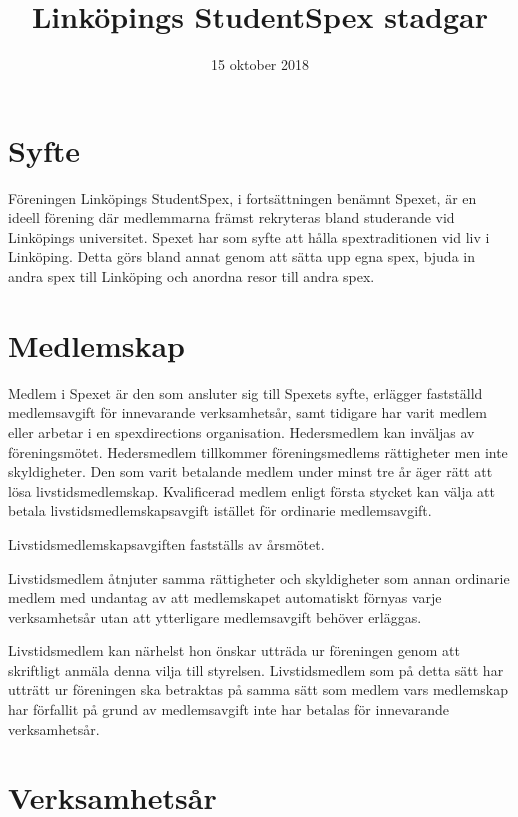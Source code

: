 \documentclass[a4paper]{article}
\title{Linköpings StudentSpex stadgar}
\author{}
\date{15 oktober 2018}
\begin{document}
\maketitle

\section{Syfte}
Föreningen Linköpings StudentSpex, i fortsättningen benämnt Spexet, är en ideell förening där medlemmarna främst rekryteras bland studerande vid Linköpings universitet. Spexet har som syfte att hålla spextraditionen vid liv i Linköping. Detta görs bland annat genom att sätta upp egna spex, bjuda in andra spex till Linköping och anordna resor till andra spex.

\section{Medlemskap}
Medlem i Spexet är den som ansluter sig till Spexets syfte, erlägger fastställd medlemsavgift för innevarande verksamhetsår, samt tidigare har varit medlem eller arbetar i en spexdirections organisation.\newline
\newline
Hedersmedlem kan inväljas av föreningsmötet. Hedersmedlem tillkommer föreningsmedlems rättigheter men inte skyldigheter.\newline
\newline
Den som varit betalande medlem under minst tre år äger rätt att lösa livstidsmedlemskap. Kvalificerad medlem enligt första stycket kan välja att betala livstidsmedlemskapsavgift istället för ordinarie medlemsavgift. 

Livstidsmedlemskapsavgiften fastställs av årsmötet.

Livstidsmedlem åtnjuter samma rättigheter och skyldigheter som annan ordinarie medlem med undantag av att medlemskapet automatiskt förnyas varje verksamhetsår utan att ytterligare medlemsavgift behöver erläggas.

Livstidsmedlem kan närhelst hon önskar utträda ur föreningen genom att skriftligt anmäla denna vilja till styrelsen. Livstidsmedlem som på detta sätt har utträtt ur föreningen ska betraktas på samma sätt som medlem vars medlemskap har förfallit på grund av medlemsavgift inte har betalas för innevarande verksamhetsår.

\section{Verksamhetsår}
\end{document}
